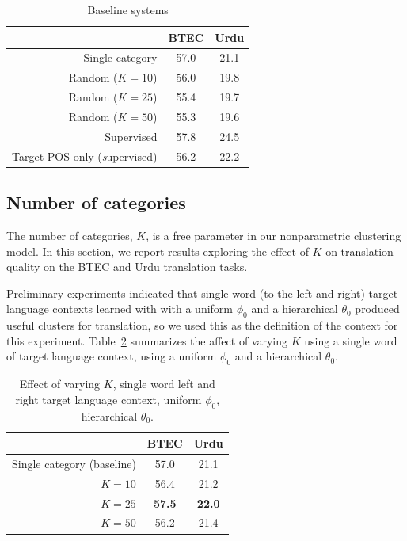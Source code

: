 \begin{table}
\caption{Baseline systems}
\begin{center}
\begin{tabular}{r|c|c}
& BTEC & Urdu \\
\hline
Single category \citep{chiang:2007} & 57.0 & 21.1 \\
\hline
Random ($K=10$) & 56.0 & 19.8 \\
Random ($K=25$) & 55.4 & 19.7 \\
Random ($K=50$) &  55.3 & 19.6 \\
\hline
Supervised \citep{samt} & 57.8 & 24.5 \\
Target POS-only ({\emph supervised}) & 56.2 & 22.2 \\
\end{tabular}
\end{center}
\label{tab:npbaselines}
\end{table}%

\subsection{Number of categories}

The number of categories, $K$, is a free parameter in our nonparametric clustering model.  In this section, we report results exploring the effect of $K$ on translation quality on the BTEC and Urdu translation tasks.

Preliminary experiments indicated that single word (to the left and right) target language contexts learned with with a uniform $\phi_0$ and a hierarchical $\theta_0$ produced useful clusters for translation, so we used this as the definition of the context for this experiment. Table~\ref{tab:npvaryk} summarizes the affect of varying $K$ using a single word of target language context, using a uniform $\phi_0$ and a hierarchical $\theta_0$. 

\begin{table}[h]
\caption{Effect of varying $K$, single word left and right target language context, uniform $\phi_0$, hierarchical $\theta_0$.}
\begin{center}
\begin{tabular}{r|c|c}
& BTEC & Urdu \\
\hline
Single category (baseline) & 57.0 & 21.1 \\
\hline
$K=10$ & 56.4 & 21.2 \\
$K=25$ & \textbf{57.5} & \textbf{22.0} \\
$K=50$ & 56.2 & 21.4 \\
\end{tabular}
\end{center}
\label{tab:npvaryk}
\end{table}%


